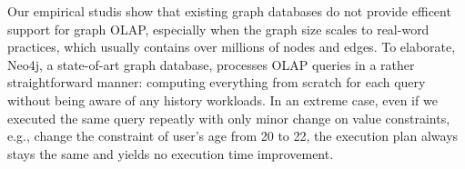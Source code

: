Our empirical studis show that existing graph databases do not provide efficent support for graph OLAP, especially when the graph size scales to real-word practices, which usually contains over millions of nodes and edges. %
To elaborate, Neo4j, a state-of-art graph database, processes OLAP queries in a rather straightforward manner: computing everything from scratch for each query without being aware of any history workloads. In an extreme case, even if we executed the same query repeatly with only minor change on value constraints, e.g., change the constraint of user's age from 20 to 22, the execution plan always stays the same and yields no execution time improvement.

